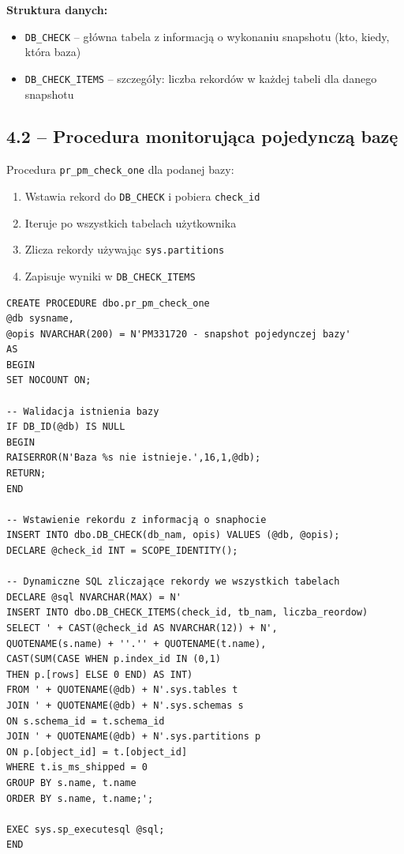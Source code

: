 \documentclass[a4paper,11pt]{article}
\begin{document}
	\textbf{Struktura danych:}
	\begin{itemize}
		\item \texttt{DB\_CHECK} -- główna tabela z informacją o wykonaniu snapshotu (kto, kiedy, która baza)
		\item \texttt{DB\_CHECK\_ITEMS} -- szczegóły: liczba rekordów w każdej tabeli dla danego snapshotu
	\end{itemize}
	
	\subsection{4.2 -- Procedura monitorująca pojedynczą bazę}
	
	Procedura \texttt{pr\_pm\_check\_one} dla podanej bazy:
	\begin{enumerate}
		\item Wstawia rekord do \texttt{DB\_CHECK} i pobiera \texttt{check\_id}
		\item Iteruje po wszystkich tabelach użytkownika
		\item Zlicza rekordy używając \texttt{sys.partitions}
		\item Zapisuje wyniki w \texttt{DB\_CHECK\_ITEMS}
	\end{enumerate}
	
	\begin{lstlisting}
CREATE PROCEDURE dbo.pr_pm_check_one
@db sysname,
@opis NVARCHAR(200) = N'PM331720 - snapshot pojedynczej bazy'
AS
BEGIN
SET NOCOUNT ON;
		
-- Walidacja istnienia bazy
IF DB_ID(@db) IS NULL 
BEGIN 
RAISERROR(N'Baza %s nie istnieje.',16,1,@db); 
RETURN; 
END
	
-- Wstawienie rekordu z informacją o snaphocie
INSERT INTO dbo.DB_CHECK(db_nam, opis) VALUES (@db, @opis);
DECLARE @check_id INT = SCOPE_IDENTITY();
		
-- Dynamiczne SQL zliczające rekordy we wszystkich tabelach
DECLARE @sql NVARCHAR(MAX) = N'
INSERT INTO dbo.DB_CHECK_ITEMS(check_id, tb_nam, liczba_reordow)
SELECT ' + CAST(@check_id AS NVARCHAR(12)) + N', 
QUOTENAME(s.name) + ''.'' + QUOTENAME(t.name),
CAST(SUM(CASE WHEN p.index_id IN (0,1) 
THEN p.[rows] ELSE 0 END) AS INT)
FROM ' + QUOTENAME(@db) + N'.sys.tables t
JOIN ' + QUOTENAME(@db) + N'.sys.schemas s 
ON s.schema_id = t.schema_id
JOIN ' + QUOTENAME(@db) + N'.sys.partitions p 
ON p.[object_id] = t.[object_id]
WHERE t.is_ms_shipped = 0
GROUP BY s.name, t.name
ORDER BY s.name, t.name;';
		
EXEC sys.sp_executesql @sql;
END
	\end{lstlisting}
	
\end{document}
